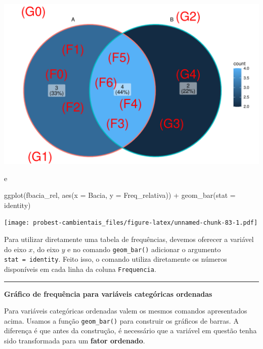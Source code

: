 \documentclass[
]{book}
\newenvironment{Shaded}{\begin{snugshade}}{\end{snugshade}}
\newcommand{\AttributeTok}[1]{\textcolor[rgb]{0.77,0.63,0.00}{#1}}
\newcommand{\FunctionTok}[1]{\textcolor[rgb]{0.00,0.00,0.00}{#1}}
\newcommand{\NormalTok}[1]{#1}
\newcommand{\SpecialCharTok}[1]{\textcolor[rgb]{0.00,0.00,0.00}{#1}}
\newcommand{\StringTok}[1]{\textcolor[rgb]{0.31,0.60,0.02}{#1}}
\begin{document}
\includegraphics{probest-cambientais_files/figure-latex/unnamed-chunk-82-1.pdf}

e

\begin{Shaded}
\begin{Highlighting}[]
\FunctionTok{ggplot}\NormalTok{(fbacia\_rel, }\FunctionTok{aes}\NormalTok{(}\AttributeTok{x =}\NormalTok{ Bacia, }\AttributeTok{y =}\NormalTok{ Freq\_relativa)) }\SpecialCharTok{+}
  \FunctionTok{geom\_bar}\NormalTok{(}\AttributeTok{stat =} \StringTok{\textquotesingle{}identity\textquotesingle{}}\NormalTok{)}
\end{Highlighting}
\end{Shaded}

\texttt{[image: probest-cambientais\_files/figure-latex/unnamed-chunk-83-1.pdf]}

Para utilizar diretamente uma tabela de frequências, devemos oferecer a variável do eixo \(x\), do eixo \(y\) e no comando \texttt{geom\_bar()} adicionar o argumento \texttt{stat\ =\ \textquotesingle{}identity\textquotesingle{}}. Feito isso, o comando utiliza diretamente os números disponíveis em cada linha da coluna \texttt{Frequencia}.

\begin{center}\rule{0.5\linewidth}{0.5pt}\end{center}

\textbf{Gráfico de frequência para variáveis categóricas ordenadas}

Para variáveis categóricas ordenadas valem os mesmos comandos apresentados acima. Usamos a função \texttt{geom\_bar()} para construir os gráficos de barras. A diferença é que antes da construção, é necessário que a variável em questão tenha sido transformada para um \textbf{fator ordenado}.
\end{document}
